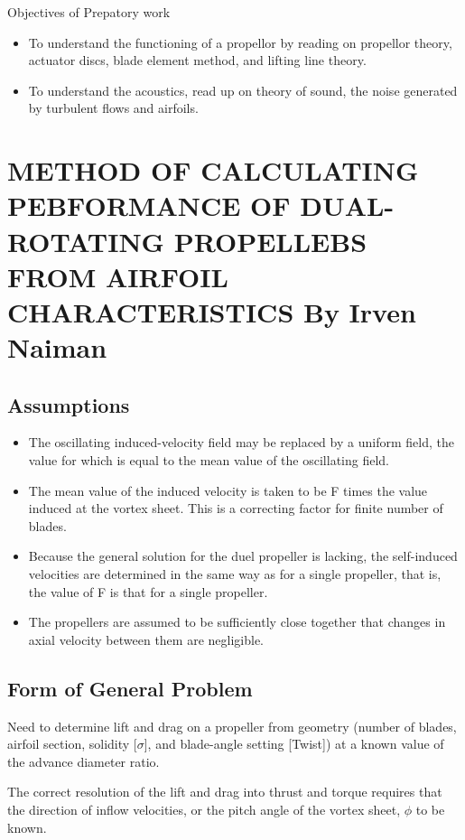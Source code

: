 \documentclass{article}
\begin{document}
Objectives of Prepatory work
\begin{itemize}
    \item To understand the functioning of a propellor by reading on propellor theory, actuator discs, blade element method, and lifting line theory.
    \item To understand the acoustics, read up on theory of sound, the noise generated by turbulent flows and airfoils.
\end{itemize}


\section{METHOD OF CALCULATING PEBFORMANCE OF DUAL-ROTATING PROPELLEBS FROM AIRFOIL CHARACTERISTICS By Irven Naiman}

\subsection{Assumptions}

\begin{itemize}
    \item The oscillating induced-velocity field may be replaced by a uniform field, the value for which is equal to the mean value of the oscillating field.
    \item The mean value of the induced velocity is taken to be F times the value induced at the vortex sheet. This is a correcting factor for finite number of blades.
    \item Because the general solution for the duel propeller is lacking, the self-induced velocities are determined in the same way as for a single propeller, that is, the value of F is that for a single propeller.
    \item The propellers are assumed to be sufficiently close together that changes in axial velocity between them are negligible.
\end{itemize}

\subsection{Form of General Problem}

Need to determine lift and drag on a propeller from geometry (number of blades, airfoil section, solidity [$\sigma$], and blade-angle setting [Twist]) at a known value of the advance diameter ratio.

The correct resolution of the lift and drag into thrust and torque requires that the direction of inflow velocities, or the pitch angle of the vortex sheet, $\phi$ to be known.
\end{document}
